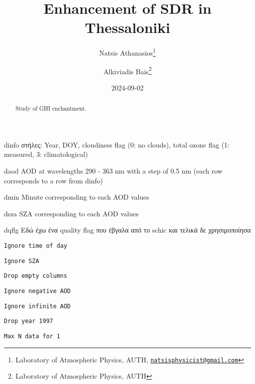 \documentclass[
  10pt,
  a4paper,oneside]{article}
\title{Enhancement of SDR in Thessaloniki}
\author{Natsis Athanasios\footnote{Laboratory of Atmospheric Physics, AUTH, \href{mailto:natsisphysicist@gmail.com}{\nolinkurl{natsisphysicist@gmail.com}}} \and Alkiviadis Bais\footnote{Laboratory of Atmospheric Physics, AUTH}}
\date{2024-09-02}
\begin{document}
\maketitle
\begin{abstract}
Study of GHI enchantment.
\end{abstract}

{
\hypersetup{linkcolor=}
\setcounter{tocdepth}{4}
\tableofcontents
}
dinfo
στήλες: Year, DOY, cloudiness flag (0: no clouds), total ozone flag (1: measured, 3: climatological)

daod
AOD at wavelengths 290 - 363 nm with a step of 0.5 nm (each row corresponds to a row from dinfo)

dmin
Minute corresponding to each AOD values

dsza
SZA corresponding to each AOD values

dqflg
Εδώ έχω ένα quality flag που έβγαλα από το schic και τελικά δε χρησιμοποίησα

\begin{verbatim}
Ignore time of day
\end{verbatim}

\begin{verbatim}
Ignore SZA
\end{verbatim}

\begin{verbatim}
Drop empty columns
\end{verbatim}

\begin{verbatim}
Ignore negative AOD
\end{verbatim}

\begin{verbatim}
Ignore infinite AOD
\end{verbatim}

\begin{verbatim}
Drop year 1997
\end{verbatim}

\begin{verbatim}
Max N data for 1 
\end{verbatim}
\end{document}
